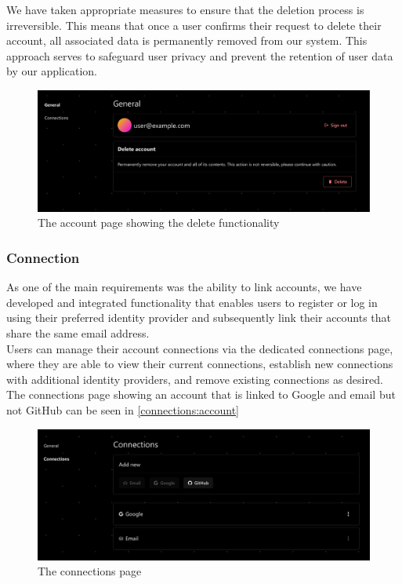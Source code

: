 \noindent
We have taken appropriate measures to ensure that the deletion process is irreversible. This means that once a user confirms their request to delete their account, all associated data is permanently removed from our system. This approach serves to safeguard user privacy and prevent the retention of user data by our application. 

\begin{figure}[!ht]
   \begin{minipage}{1\textwidth}
     \centering
     \includegraphics[width=.85\textwidth]{Figures/settings-page/general-settings-page.pdf}
     \caption[Delete account page]{The account page showing the delete functionality}
     \label{delete:account}
   \end{minipage}\hfill
\end{figure}

\subsubsection{Connection}

As one of the main requirements was the ability to link accounts, we have developed and integrated functionality that enables users to register or log in using their preferred identity provider and subsequently link their accounts that share the same email address. \\

\noindent
Users can manage their account connections via the dedicated connections page, where they are able to view their current connections, establish new connections with additional identity providers, and remove existing connections as desired. The connections page showing an account that is linked to Google and email but not GitHub can be seen in \autoref{connections:account}

\begin{figure}[!ht]
   \begin{minipage}{1\textwidth}
     \centering
     \includegraphics[width=.85\textwidth]{Figures/settings-page/connections-page.pdf}
     \caption[Connections page]{The connections page}\label{connections:account}
   \end{minipage}\hfill
\end{figure}

